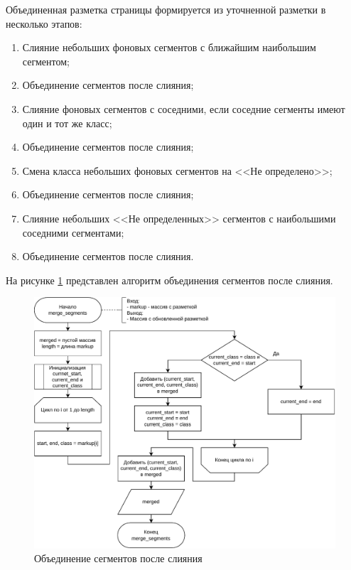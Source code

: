 Объединенная разметка страницы формируется из уточненной разметки в несколько этапов:
\begin{enumerate}
    \item Слияние небольших фоновых сегментов с ближайшим наибольшим сегментом;
    \item Объединение сегментов после слияния;
    \item Слияние фоновых сегментов с соседними, если соседние сегменты имеют один и тот же класс;
    \item Объединение сегментов после слияния;
    \item Смена класса небольших фоновых сегментов на <<Не определено>>;
    \item Объединение сегментов после слияния;
    \item Слияние небольших <<Не определенных>> сегментов с наибольшими соседними сегментами;
    \item Объединение сегментов после слияния.
\end{enumerate}

На рисунке \ref{fig:merge-segments} представлен алгоритм объединения сегментов после слияния.

\begin{figure}[H]
	\centering
	\includegraphics[width=\textwidth]{diag/merge.segments.pdf}
	\caption{Объединение сегментов после слияния}
	\label{fig:merge-segments}
\end{figure}


